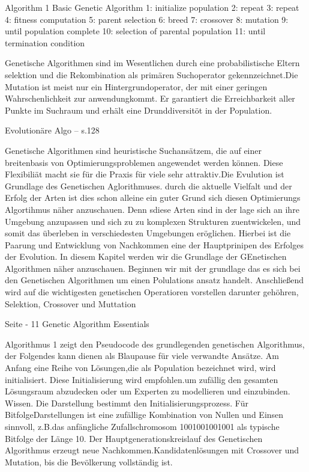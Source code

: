 Algorithm 1 Basic Genetic Algorithm
1: initialize population
2: repeat
3: 		repeat
4:			fitness computation
5:			parent selection
6:			breed
7:				crossover
8:				mutation
9:		until population complete
10:		selection of parental population
11: until termination condition



\iffalse
Genetische Algorithmen sind im Wesentlichen durch eine probabilistische Eltern selektion und die Rekombination als primären Suchoperator gekennzeichnet.Die Mutation ist meist nur ein Hintergrundoperator, der mit einer geringen Wahrschenlichkeit zur anwendungkommt. Er garantiert die Erreichbarkeit aller Punkte im Suchraum und erhält eine Drunddiversitöt in der Population.

Evolutionäre Algo -- s.128


Genetische Algorithmen sind heuristische Suchansätzem, die auf einer breitenbasis von Optimierungsproblemen angewendet werden können. Diese Flexibiliät macht sie für die Praxis für viele sehr attraktiv.Die Evulution ist Grundlage des Genetischen Aglorithmuses. durch die aktuelle Vielfalt und der Erfolg der Arten ist dies schon alleine ein guter Grund sich diesen Optimierungs Algortihmus näher anzuschauen. Denn sdiese Arten sind in der lage sich an ihre Umgebung anzupassen und sich zu zu komplexen Strukturen zuentwickelen, und somit das überleben in verschiedesten Umgebungen eröglichen. Hierbei ist die Paarung und Entwicklung von Nachkommen eine der Hauptprinipen des Erfolges der Evolution. In diesem Kapitel werden wir die Grundlage der GEnetischen Algorithmen näher anzuschauen. Beginnen wir mit der grundlage das es sich bei den Genetischen Algorithmen um einen Polulations ansatz handelt. Anschließend wird auf die wichtigesten genetischen Operatioren vorstellen darunter gehöhren, Selektion, Crossover und Muttation

Seite - 11 Genetic Algorithm Essentials


Algorithmus 1 zeigt den Pseudocode des grundlegenden genetischen Algorithmus, der Folgendes kann dienen als Blaupause für viele verwandte Ansätze. Am Anfang eine Reihe von Lösungen,die als Population bezeichnet wird, wird initialisiert. Diese Initialisierung wird empfohlen.um zufällig den gesamten Lösungsraum abzudecken oder um Experten zu modellieren und einzubinden. Wissen. Die Darstellung bestimmt den Initialisierungsprozess. Für BitfolgeDarstellungen ist eine zufällige Kombination von Nullen und Einsen sinnvoll, z.B.das anfängliche Zufallschromosom 1001001001001 als typische Bitfolge der Länge 10. Der Hauptgenerationskreislauf des Genetischen Algorithmus erzeugt neue Nachkommen.Kandidatenlösungen mit Crossover und Mutation, bis die Bevölkerung vollständig ist.

